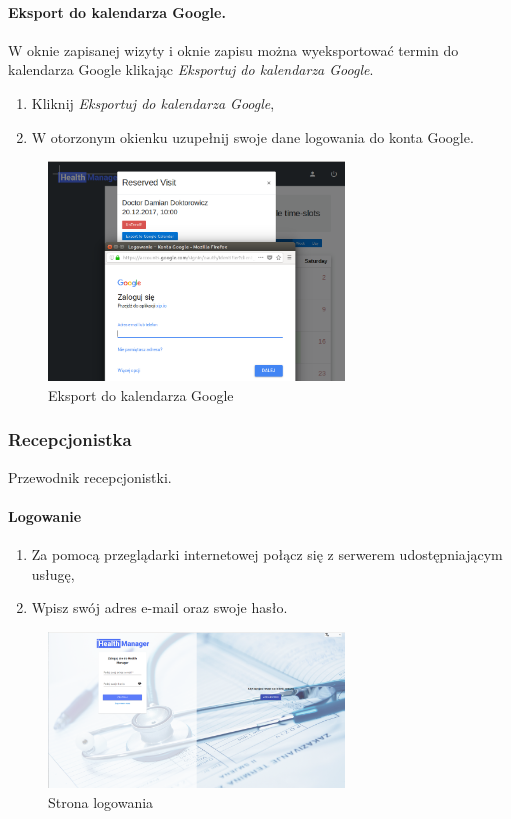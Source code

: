\documentclass[polish,12pt]{aghthesis}
\begin{document}
    \paragraph{Eksport do kalendarza Google.}{ W oknie zapisanej wizyty i oknie zapisu można wyeksportować termin do kalendarza Google klikając \emph{Eksportuj do kalendarza Google}.
    \begin{enumerate}
      \item Kliknij \emph{Eksportuj do kalendarza Google},
      \item W otorzonym okienku uzupełnij swoje dane logowania do konta Google.
    \end{enumerate}
       \begin{figure}[H]
        \includegraphics[width=0.7\textwidth]{gui-google-export}
        \caption{Eksport do kalendarza Google}
        \end{figure}  
    }
\subsubsection{Recepcjonistka}
Przewodnik recepcjonistki.
    \paragraph{Logowanie}{
      \begin{enumerate}
          \item Za pomocą przeglądarki internetowej połącz się z serwerem udostępniającym usługę,
          \item Wpisz swój adres e-mail oraz swoje hasło.
      \end{enumerate}
      \begin{figure}[H]
          \includegraphics[width=0.7\textwidth]{gui-loginpage}
          \caption{Strona logowania}
      \end{figure}
    }
\end{document}
